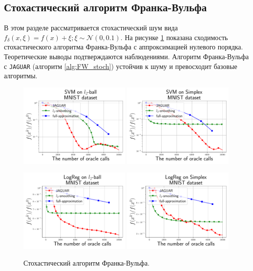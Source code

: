 \subsection{Стохастический алгоритм Франка-Вульфа}

    В этом разделе рассматривается стохастический шум вида $f_\delta(x, \xi) = f(x) + \xi; \xi \sim \mathcal{N}(0, 0.1)$. На рисунке \ref{fig:FW_stoch} показана сходимость стохастического алгоритма Франка-Вульфа с аппроксимацией нулевого порядка. Теоретические выводы подтверждаются наблюдениями. Алгоритм Франка-Вульфа с \texttt{JAGUAR} (алгоритм \ref{alg:FW_stoch}) устойчив к шуму и превосходит базовые алгоритмы.

    \begin{figure}[H]
        \centering
        \includegraphics[width=0.49\textwidth]{figures/Stochastics_TPF_FW_SVM_L2_MNIST.pdf}
        \includegraphics[width=0.49\textwidth]{figures/Stochastics_TPF_FW_SVM_Simplex_MNIST.pdf}

        \includegraphics[width=0.49\textwidth]{figures/Stochastics_TPF_FW_LogReg_L2_MNIST.pdf}
        \includegraphics[width=0.49\textwidth]{figures/Stochastics_TPF_FW_LogReg_Simplex_MNIST.pdf}
        
        \caption{Стохастический алгоритм Франка-Вульфа.}
        \label{fig:FW_stoch}
    \end{figure}